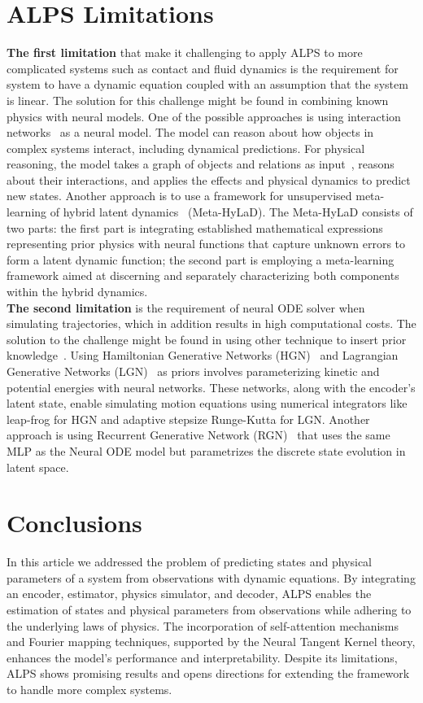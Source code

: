 \documentclass[acmtog]{techreportacmart}
\begin{document}
\section{ALPS Limitations}
\textbf{The first limitation} that make it challenging to apply ALPS to more complicated systems such as contact and fluid dynamics is the requirement for system to have a dynamic equation coupled with an assumption that the system is linear. The solution for this challenge might be found in combining known physics with neural models. One of the possible approaches is using interaction networks~\cite{battaglia2016interaction} as a neural model. The model can reason about how objects in complex systems interact, including dynamical predictions. For physical reasoning, the model takes a graph of objects and relations as input~\cite{scarselli2009graph}, reasons about their interactions, and applies the effects and physical dynamics to predict new states. Another approach is to use a framework for unsupervised meta-learning of hybrid latent dynamics~\cite{ye2024unsupervised} (Meta-HyLaD). The Meta-HyLaD consists of two parts: the first part is integrating established mathematical expressions representing prior physics with neural functions that capture unknown errors to form a latent dynamic function; the second part is employing a meta-learning framework aimed at discerning and separately characterizing both components within the hybrid dynamics.
\\
\textbf{The second limitation} is the requirement of neural ODE solver when simulating trajectories, which in addition results in high computational costs. The solution to the challenge might be found in using other technique to insert prior knowledge~\cite{botev2021which}. Using Hamiltonian Generative Networks (HGN)~\cite{toth2019hamiltonian} and Lagrangian Generative Networks (LGN)~\cite{lutter2019deep} as priors involves parameterizing kinetic and potential energies with neural networks. These networks, along with the encoder's latent state, enable simulating motion equations using numerical integrators like leap-frog for HGN and adaptive stepsize Runge-Kutta for LGN. Another approach is using Recurrent Generative Network (RGN)~\cite{chen2019symplectic} that uses the same MLP as the Neural ODE model but parametrizes the discrete state evolution in latent space. 
\section{Conclusions}
In this article we addressed the problem of predicting states and physical parameters of a system from observations with dynamic equations. By integrating an encoder, estimator, physics simulator, and decoder, ALPS enables the estimation of states and physical parameters from observations while adhering to the underlying laws of physics. The incorporation of self-attention mechanisms and Fourier mapping techniques, supported by the Neural Tangent Kernel theory, enhances the model's performance and interpretability. Despite its limitations, ALPS shows promising results and opens directions for extending the framework to handle more complex systems.



\end{document}

